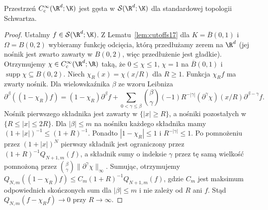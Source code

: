 \begin{twierdzenie}
\label{thm:density-schwartz17}
Przestrzeń $C_c^\infty(\R^d;\K)$ jest gęsta w
$\mathcal S(\R^d;\K)$ dla standardowej topologii Schwartza.
\end{twierdzenie}
\begin{proof}
Ustalmy $f\in\mathcal S(\R^d;\K)$.
Z Lematu~\ref{lem:cutoffs17} dla $K=\overline B(0,1)$
i $\Omega=B(0,2)$ wybieramy funkcję odcięcia, którą
przedłużamy zerem na $\R^d$ (jej nośnik jest zwarto zawarty
w $B(0,2)$, więc przedłużenie jest gładkie).
Otrzymujemy $\chi\in C_c^\infty(\R^d;\R)$ taką, że
$0\le\chi\le1$, $\chi=1$ na $\overline B(0,1)$
i $\operatorname{supp}\chi\subseteq B(0,2)$.
Niech $\chi_R(x)=\chi(x/R)$ dla $R\ge1$.
Funkcja $\chi_R f$ ma zwarty nośnik. Dla wielowskaźnika $\beta$
ze wzoru Leibniza
\[
\partial^\beta((1-\chi_R)f)
=(1-\chi_R)\partial^\beta f+
\sum_{0<\gamma\le\beta}\binom{\beta}{\gamma}
 (-1)R^{-|\gamma|}(\partial^\gamma\chi)(x/R)
 \partial^{\beta-\gamma}f.
\]
Nośnik pierwszego składnika jest zawarty w $\{|x|\ge R\}$,
a nośniki pozostałych w $\{R\le|x|\le2R\}$.
Dla $|\beta|\le m$ na nośniku każdego składnika mamy
$(1+|x|)^{-1}\le(1+R)^{-1}$. Ponadto
$|1-\chi_R|\le1$ i $R^{-|\gamma|}\le1$.
Po pomnożeniu przez $(1+|x|)^N$ pierwszy składnik jest
ograniczony przez $(1+R)^{-1}Q_{N+1,m}(f)$, a składnik
sumy o indeksie $\gamma$ przez tę samą wielkość
pomnożoną przez $\binom{\beta}{\gamma}\|\partial^\gamma\chi\|_\infty$.
Sumując, otrzymujemy
$Q_{N,m}((1-\chi_R)f)\le C_m(1+R)^{-1}Q_{N+1,m}(f)$,
gdzie $C_m$ jest maksimum odpowiednich skończonych sum
dla $|\beta|\le m$ i nie zależy od $R$ ani $f$.
Stąd $Q_{N,m}(f-\chi_Rf)\to0$ przy $R\to\infty$.
\end{proof}

